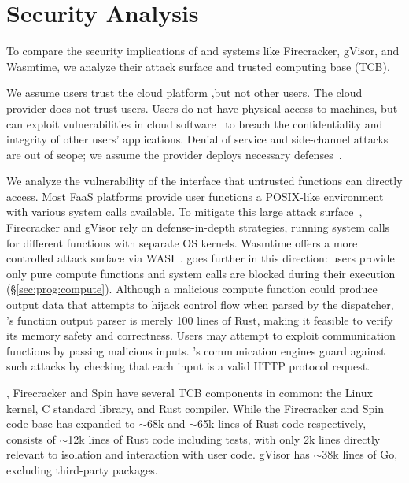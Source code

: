 \section{Security Analysis}\label{sec:security}

To compare the security implications of \dandelion and systems like Firecracker, gVisor, and Wasmtime, we analyze their attack surface and trusted computing base (TCB).

 We assume users trust the cloud platform ,but not other users. The cloud provider does not trust users. Users do not have physical access to machines, but can exploit vulnerabilities in cloud software~\cite{linux-kernel-vulnerabilities, hypsec}
to breach the confidentiality and integrity of other users' applications.
Denial of service and side-channel attacks are out of scope; we assume the provider deploys necessary defenses~\cite{microsoft-prevent-sidechannels}.


 We analyze the vulnerability of the interface that untrusted functions can directly access. Most FaaS platforms provide user functions a POSIX-like environment with various system calls available. To mitigate this large attack surface~\cite{firecracker-container-escape}, Firecracker and gVisor rely on defense-in-depth strategies, running system calls for different functions with separate OS kernels.
Wasmtime offers a more controlled attack surface via WASI~\cite{wasi}.
\dandelion goes further in this direction: users provide only pure compute functions and system calls are blocked during their execution (\S\ref{sec:prog:compute}).
Although a malicious compute function could produce output data that attempts to hijack control flow when parsed by the dispatcher,
\dandelion's function output parser is merely 100 lines of Rust, making it feasible to verify its memory safety and correctness. 
Users may attempt to exploit communication functions by passing malicious inputs. \dandelion's communication engines guard against such attacks by checking that each input is a valid HTTP protocol request.

\dandelion, Firecracker and Spin have several TCB components in common: the Linux kernel, C standard library, and Rust compiler. 
While the Firecracker and Spin code base has expanded to $\sim$68k and $\sim$65k lines of Rust code respectively, \dandelion consists of $\sim$12k lines of Rust code including tests, with only 2k lines directly relevant to isolation and interaction with user code.
gVisor has $\sim$38k lines of Go, excluding third-party packages.